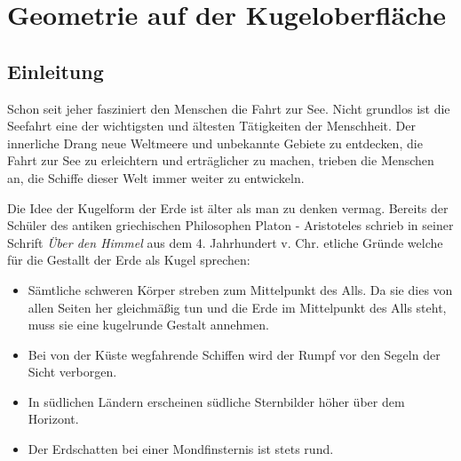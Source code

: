 \chapter{Geometrie auf der Kugeloberfläche\label{chapter:kugel}}
\begin{refsection}

\section{Einleitung}

Schon seit jeher fasziniert den Menschen die Fahrt zur See. Nicht grundlos ist die Seefahrt eine der wichtigsten und ältesten Tätigkeiten der Menschheit. Der innerliche Drang neue Weltmeere und unbekannte Gebiete zu entdecken, die Fahrt zur See zu erleichtern und erträglicher zu machen, trieben die Menschen an, die Schiffe dieser Welt immer weiter zu entwickeln.

Die Idee der Kugelform der Erde ist älter als man zu denken vermag. Bereits der Schüler des antiken griechischen Philosophen Platon - Aristoteles schrieb in seiner Schrift \textit{Über den Himmel} aus dem 4. Jahrhundert v. Chr. etliche Gründe welche für die Gestallt der Erde als Kugel sprechen:

\begin{itemize}
      \item Sämtliche schweren Körper streben zum Mittelpunkt des Alls. Da sie dies von allen Seiten her gleichmäßig tun und die Erde im Mittelpunkt des Alls steht, muss sie eine kugelrunde Gestalt annehmen. 
\item Bei von der Küste wegfahrende Schiffen wird der Rumpf vor den Segeln der Sicht verborgen. 
\item In südlichen Ländern erscheinen südliche Sternbilder höher über dem Horizont.
\item Der Erdschatten bei einer Mondfinsternis ist stets rund.
\end{itemize}


\end{refsection}
